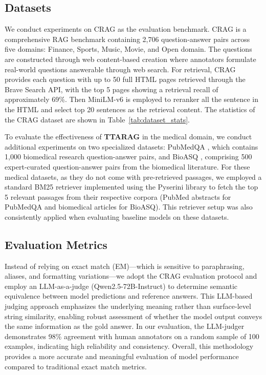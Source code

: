 \documentclass{article}
\newcommand{\ourmethod}{{\fontfamily{lmtt}\selectfont \textbf{TTARAG}}\xspace}
\begin{document}
\subsection{Datasets}
We conduct experiments on CRAG \cite{yang2024crag} as the evaluation benchmark. CRAG is a comprehensive RAG benchmark containing 2,706 question-answer pairs across five domains: Finance, Sports, Music, Movie, and Open domain. The questions are constructed through web content-based creation where annotators formulate real-world questions answerable through web search. For retrieval, CRAG provides each question with up to 50 
full HTML pages retrieved through the Brave Search API, with 
the top 5 pages showing a retrieval recall of approximately 
69\%.  Then MiniLM-v6 is employed to reranker all the sentence in the HTML and select top 20 sentences as the retrieval content. The statistics of the CRAG dataset are shown in Table~\ref{tab:dataset_stats}.


To evaluate the effectiveness of \ourmethod in the medical domain, we conduct additional experiments on two specialized datasets: PubMedQA \cite{jin2019pubmedqa}, which contains 1,000 biomedical research question-answer pairs, and BioASQ \cite{bioasq}, comprising 500 expert-curated question-answer pairs from the biomedical literature. For these medical datasets, as they do not come with pre-retrieved passages, we employed a standard BM25 retriever implemented using the Pyserini library to fetch the top 5 relevant passages from their respective corpora (PubMed abstracts for PubMedQA and biomedical articles for BioASQ). This retriever setup was also consistently applied when evaluating baseline models on these datasets.

\subsection{Evaluation Metrics}
 Instead of relying on exact match (EM)—which is sensitive to paraphrasing, aliases, and formatting variations—we adopt the CRAG evaluation protocol and employ an LLM-as-a-judge (Qwen2.5-72B-Instruct) to determine semantic equivalence between model predictions and reference answers. This LLM-based judging approach emphasizes the underlying meaning rather than surface-level string similarity, enabling robust assessment of whether the model output conveys the same information as the gold answer. In our evaluation, the LLM-judger demonstrates 98\% agreement with human annotators on a random sample of 100 examples, indicating high reliability and consistency. Overall, this methodology provides a more accurate and meaningful evaluation of model performance compared to traditional exact match metrics.
\end{document}
